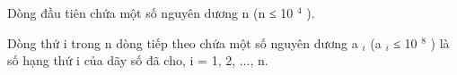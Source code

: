 Dòng đầu tiên chứa một số nguyên dương n (n ≤ 10 $^ 4 $ ).

Dòng thứ i trong n dòng tiếp theo chứa một số nguyên dương a $_ i $ (a $_ i $ ≤ 10 $^ 8 $ ) là số hạng thứ i của dãy số đã cho, i = 1, 2, ..., n.